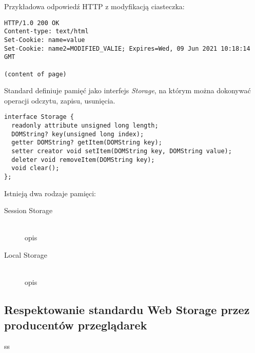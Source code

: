 Przykładowa odpowiedź HTTP z modyfikacją ciasteczka:
\lstset{language=Octave}
\begin{lstlisting}
HTTP/1.0 200 OK
Content-type: text/html
Set-Cookie: name=value
Set-Cookie: name2=MODIFIED_VALIE; Expires=Wed, 09 Jun 2021 10:18:14 GMT

(content of page)
\end{lstlisting}

Standard definiuje pamięć jako interfejs \emph{Storage}, na którym można dokonywać operacji odczytu, zapisu, usunięcia.

\lstset{language=Octave}
\begin{lstlisting}
interface Storage {
  readonly attribute unsigned long length;
  DOMString? key(unsigned long index);
  getter DOMString? getItem(DOMString key);
  setter creator void setItem(DOMString key, DOMString value);
  deleter void removeItem(DOMString key);
  void clear();
};
\end{lstlisting}

Istnieją dwa rodzaje pamięci:


\begin{description}
  \item[Session Storage] \hfill \\
  opis
  \item[Local Storage] \hfill \\
  opis
\end{description}


\subsection{Respektowanie standardu Web Storage przez producentów przeglądarek}

ss

